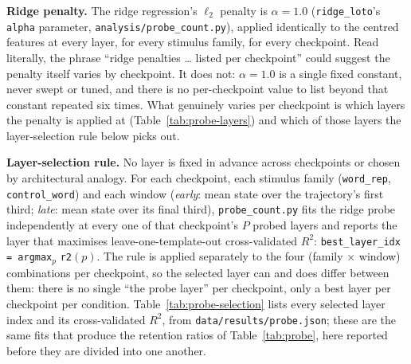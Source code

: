 \documentclass[11pt]{article}
\begin{document}
\noindent\textbf{Ridge penalty.} The ridge regression's $\ell_2$ penalty is
$\alpha=1.0$ (\texttt{ridge\_loto}'s \texttt{alpha} parameter,
\texttt{analysis/probe\_count.py}), applied identically to the centred
features at every layer, for every stimulus family, for every checkpoint.
Read literally, the phrase ``ridge penalties \dots{} listed
per checkpoint'' could suggest the penalty itself varies by checkpoint. It
does not: $\alpha=1.0$ is a single fixed constant, never swept or tuned, and
there is no per-checkpoint value to list beyond that constant repeated six
times. What genuinely varies per checkpoint is which layers the penalty is
applied at (Table~\ref{tab:probe-layers}) and which of those layers the
layer-selection rule below picks out.

\noindent\textbf{Layer-selection rule.} No layer is fixed in advance across
checkpoints or chosen by architectural analogy. For each checkpoint, each
stimulus family (\texttt{word\_rep}, \texttt{control\_word}) and each window
(\emph{early}: mean state over the trajectory's first third; \emph{late}: mean
state over its final third), \texttt{probe\_count.py} fits the ridge probe
independently at every one of that checkpoint's $P$ probed layers and reports
the layer that maximises leave-one-template-out cross-validated $R^2$:
\texttt{best\_layer\_idx = argmax}$_p$ \texttt{r2}$(p)$. The rule is applied
separately to the four (family $\times$ window) combinations per checkpoint,
so the selected layer can and does differ between them: there is no single
``the probe layer'' per checkpoint, only a best layer per checkpoint per
condition. Table~\ref{tab:probe-selection} lists every selected layer index
and its cross-validated $R^2$, from \texttt{data/results/probe.json}; these
are the same fits that produce the retention ratios of
Table~\ref{tab:probe}, here reported before they are divided into one
another.
\end{document}
